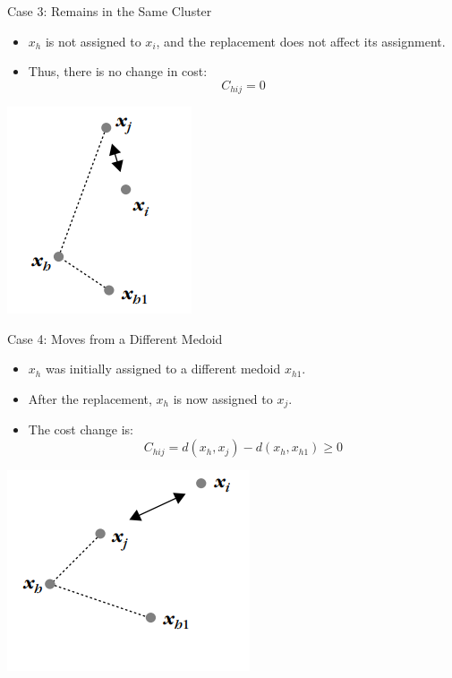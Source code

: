 \documentclass{beamer}
\begin{document}
\begin{frame}{Case 3: Remains in the Same Cluster}
    \begin{itemize}
        \item \(x_h\) is not assigned to \(x_i\), and the replacement does not affect its assignment.
        \item Thus, there is no change in cost:
        \[
        C_{hij} = 0
        \]
    \end{itemize}
    \begin{center}
        \includegraphics[width=0.3\linewidth]{C4.png}  %
    \end{center}
\end{frame}

\begin{frame}{Case 4: Moves from a Different Medoid}
    \begin{itemize}
        \item \(x_h\) was initially assigned to a different medoid \(x_{h1}\).
        \item After the replacement, \(x_h\) is now assigned to \(x_j\).
        \item The cost change is:
        \[
        C_{hij} = d(x_h, x_j) - d(x_h, x_{h1}) \geq 0
        \]
    \end{itemize}
    \begin{center}
        \includegraphics[width=0.5\linewidth]{c5.png}  %
    \end{center}
\end{frame}
\end{document}
